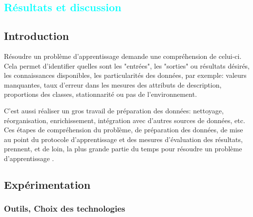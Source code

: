 
%
%

\textcolor{cyan}{\chapter{Résultats et discussion}}

\section{Introduction}
	Résoudre un problème d'apprentissage demande une compréhension de celui-ci. Cela permet d’identifier quelles sont les "entrées", les  "sorties" ou résultats désirés, les connaissances disponibles, les particularités des données, par exemple: valeurs manquantes, taux d’erreur dans les mesures des attributs de description, proportions des classes, stationnarité ou pas de l'environnement.  
	
	C'est aussi réaliser un gros travail de {préparation des données}: nettoyage, réorganisation, enrichissement, intégration avec d'autres sources de données, etc. Ces étapes de compréhension du problème, de préparation des données, de mise au point du protocole d'apprentissage et des mesures d'évaluation des résultats, prennent, et de loin, la plus grande partie du temps pour résoudre un problème d'apprentissage \cite{antoine2018apprentissage}.
	
\section{Expérimentation}


	\subsection{Outils, Choix des technologies}
